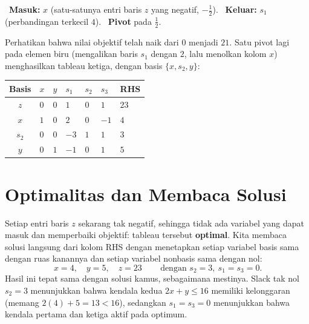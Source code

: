 \noindent%
{\color{algenter}\ \textbf{Masuk:}} $x$ (satu-satunya entri baris $z$ yang negatif, $-\tfrac12$).\quad
{\color{algleave}\ \textbf{Keluar:}} $s_1$ (perbandingan terkecil $4$).\quad
{\color{algpivot}\ \textbf{Pivot}} pada $\tfrac12$.

\medskip
Perhatikan bahwa nilai objektif telah naik dari $0$ menjadi $21$. Satu pivot
lagi pada elemen biru (mengalikan baris $s_1$ dengan $2$, lalu menolkan kolom
$x$) menghasilkan tableau ketiga, dengan basis $\{x,s_2,y\}$:
\begin{center}
\renewcommand{\arraystretch}{1.3}
\begin{tabular}{c|ZZZZZ|Z}
\toprule
Basis & $x$ & $y$ & $s_1$ & $s_2$ & $s_3$ & RHS\\
\midrule
{}$z$ & $0$ & $0$ & $1$ & $0$ & $1$ & $23$\\
\midrule
$x$   & $1$ & $0$ & $2$  & $0$ & $-1$ & $4$\\
$s_2$ & $0$ & $0$ & $-3$ & $1$ & $1$  & $3$\\
$y$   & $0$ & $1$ & $-1$ & $0$ & $1$  & $5$\\
\bottomrule
\end{tabular}
\end{center}

\section{Optimalitas dan Membaca Solusi}
\label{sec:tableau-optimality}

Setiap entri baris $z$ sekarang tak negatif, sehingga tidak ada variabel yang
dapat masuk dan memperbaiki objektif: tableau tersebut \textbf{optimal}. Kita
membaca solusi langsung dari kolom RHS dengan menetapkan setiap variabel basis
sama dengan ruas kanannya dan setiap variabel nonbasis sama dengan nol:
\[
\boxed{\,x = 4,\quad y = 5,\quad z = 23\,}
\qquad\text{dengan } s_2 = 3,\ s_1 = s_3 = 0.
\]
Hasil ini tepat sama dengan solusi kamus, sebagaimana mestinya. Slack tak nol
$s_2=3$ menunjukkan bahwa kendala kedua $2x+y\le 16$ memiliki kelonggaran
(memang $2(4)+5 = 13 < 16$), sedangkan $s_1=s_3=0$ menunjukkan bahwa kendala
pertama dan ketiga aktif pada optimum.

